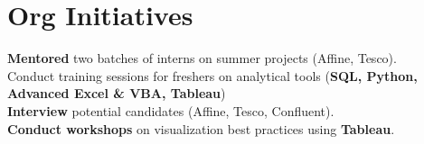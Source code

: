 \section{Org Initiatives}
  \begin{itemize}[leftmargin=0.1in, label={}]
    \normalsize{
      \item{
        \textbf{Mentored} two batches of interns on summer projects (Affine, Tesco). \\
        Conduct training sessions for freshers on analytical tools (\textbf{SQL, Python, Advanced Excel \& VBA, Tableau}) \\
        \textbf{Interview} potential candidates (Affine, Tesco, Confluent). \\
        \textbf{Conduct workshops} on visualization best practices using \textbf{Tableau}. \\
      }
    }
  \end{itemize}
